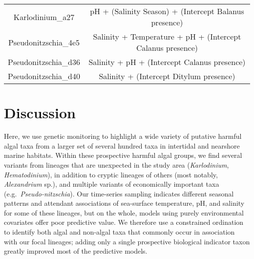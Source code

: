 \documentclass[
]{article}
\begin{document}
\begin{longtable}[]{@{}cc@{}}
\begin{minipage}[t]{0.29\columnwidth}
Karlodinium\_a27\strut
\end{minipage} & \begin{minipage}[t]{0.43\columnwidth}\centering
pH + (Salinity \textbar{} Season) + (Intercept \textbar{} Balanus
presence)\strut
\end{minipage}\tabularnewline
\begin{minipage}[t]{0.29\columnwidth}\centering
Pseudonitzschia\_4e5\strut
\end{minipage} & \begin{minipage}[t]{0.43\columnwidth}\centering
Salinity + Temperature + pH + (Intercept \textbar{} Calanus
presence)\strut
\end{minipage}\tabularnewline
\begin{minipage}[t]{0.29\columnwidth}\centering
Pseudonitzschia\_d36\strut
\end{minipage} & \begin{minipage}[t]{0.43\columnwidth}\centering
Salinity + pH + (Intercept \textbar{} Calanus presence)\strut
\end{minipage}\tabularnewline
\begin{minipage}[t]{0.29\columnwidth}\centering
Pseudonitzschia\_d40\strut
\end{minipage} & \begin{minipage}[t]{0.43\columnwidth}\centering
Salinity + (Intercept \textbar{} Ditylum presence)\strut
\end{minipage}\tabularnewline
\bottomrule
\end{longtable}

\hypertarget{discussion}{%
\section{Discussion}\label{discussion}}

Here, we use genetic monitoring to highlight a wide variety of putative
harmful algal taxa from a larger set of several hundred taxa in
intertidal and nearshore marine habitats. Within these prospective
harmful algal groups, we find several variants from lineages that are
unexpected in the study area (\emph{Karlodinium}, \emph{Hematodinium}),
in addition to cryptic lineages of others (most notably,
\emph{Alexandrium} sp.), and multiple variants of economically important
taxa (e.g.~\emph{Pseudo-nitzschia}). Our time-series sampling indicates
different seasonal patterns and attendant associations of sea-surface
temperature, pH, and salinity for some of these lineages, but on the
whole, models using purely environmental covariates offer poor
predictive value. We therefore use a constrained ordination to identify
both algal and non-algal taxa that commonly occur in association with
our focal lineages; adding only a single prospective biological
indicator taxon greatly improved most of the predictive models.
\end{document}

